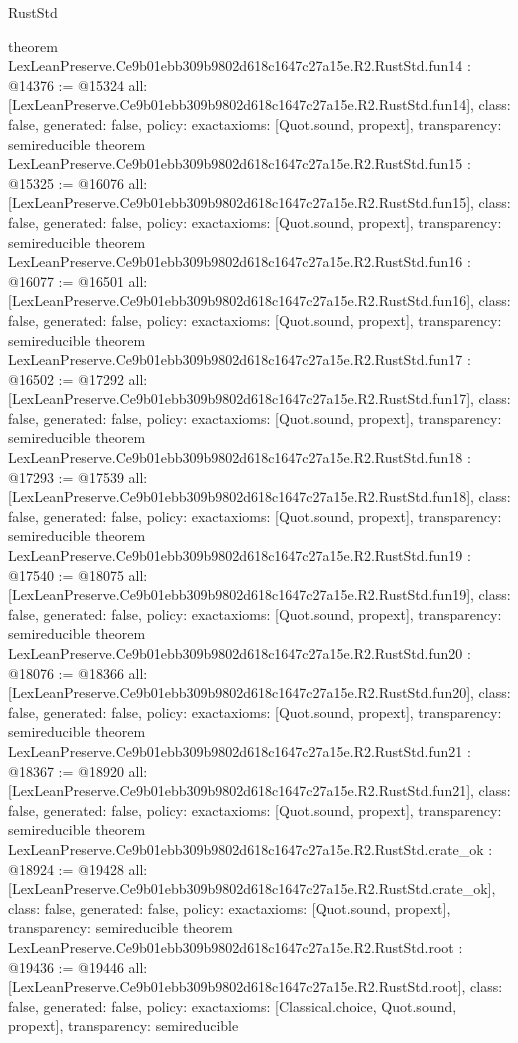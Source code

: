 \begin{lexlean}{RustStd}
\begin{coremodule}
{}
theorem LexLeanPreserve.Ce9b01ebb309b9802d618c1647c27a15e.R2.RustStd.fun14 : @14376 := @15324 {
  all: [LexLeanPreserve.Ce9b01ebb309b9802d618c1647c27a15e.R2.RustStd.fun14],
  class: false,
  generated: false,
  policy: exact{axioms: [Quot.sound, propext]},
  transparency: semireducible
}
theorem LexLeanPreserve.Ce9b01ebb309b9802d618c1647c27a15e.R2.RustStd.fun15 : @15325 := @16076 {
  all: [LexLeanPreserve.Ce9b01ebb309b9802d618c1647c27a15e.R2.RustStd.fun15],
  class: false,
  generated: false,
  policy: exact{axioms: [Quot.sound, propext]},
  transparency: semireducible
}
theorem LexLeanPreserve.Ce9b01ebb309b9802d618c1647c27a15e.R2.RustStd.fun16 : @16077 := @16501 {
  all: [LexLeanPreserve.Ce9b01ebb309b9802d618c1647c27a15e.R2.RustStd.fun16],
  class: false,
  generated: false,
  policy: exact{axioms: [Quot.sound, propext]},
  transparency: semireducible
}
theorem LexLeanPreserve.Ce9b01ebb309b9802d618c1647c27a15e.R2.RustStd.fun17 : @16502 := @17292 {
  all: [LexLeanPreserve.Ce9b01ebb309b9802d618c1647c27a15e.R2.RustStd.fun17],
  class: false,
  generated: false,
  policy: exact{axioms: [Quot.sound, propext]},
  transparency: semireducible
}
theorem LexLeanPreserve.Ce9b01ebb309b9802d618c1647c27a15e.R2.RustStd.fun18 : @17293 := @17539 {
  all: [LexLeanPreserve.Ce9b01ebb309b9802d618c1647c27a15e.R2.RustStd.fun18],
  class: false,
  generated: false,
  policy: exact{axioms: [Quot.sound, propext]},
  transparency: semireducible
}
theorem LexLeanPreserve.Ce9b01ebb309b9802d618c1647c27a15e.R2.RustStd.fun19 : @17540 := @18075 {
  all: [LexLeanPreserve.Ce9b01ebb309b9802d618c1647c27a15e.R2.RustStd.fun19],
  class: false,
  generated: false,
  policy: exact{axioms: [Quot.sound, propext]},
  transparency: semireducible
}
theorem LexLeanPreserve.Ce9b01ebb309b9802d618c1647c27a15e.R2.RustStd.fun20 : @18076 := @18366 {
  all: [LexLeanPreserve.Ce9b01ebb309b9802d618c1647c27a15e.R2.RustStd.fun20],
  class: false,
  generated: false,
  policy: exact{axioms: [Quot.sound, propext]},
  transparency: semireducible
}
theorem LexLeanPreserve.Ce9b01ebb309b9802d618c1647c27a15e.R2.RustStd.fun21 : @18367 := @18920 {
  all: [LexLeanPreserve.Ce9b01ebb309b9802d618c1647c27a15e.R2.RustStd.fun21],
  class: false,
  generated: false,
  policy: exact{axioms: [Quot.sound, propext]},
  transparency: semireducible
}
theorem LexLeanPreserve.Ce9b01ebb309b9802d618c1647c27a15e.R2.RustStd.crate_ok : @18924 := @19428 {
  all: [LexLeanPreserve.Ce9b01ebb309b9802d618c1647c27a15e.R2.RustStd.crate_ok],
  class: false,
  generated: false,
  policy: exact{axioms: [Quot.sound, propext]},
  transparency: semireducible
}
theorem LexLeanPreserve.Ce9b01ebb309b9802d618c1647c27a15e.R2.RustStd.root : @19436 := @19446 {
  all: [LexLeanPreserve.Ce9b01ebb309b9802d618c1647c27a15e.R2.RustStd.root],
  class: false,
  generated: false,
  policy: exact{axioms: [Classical.choice, Quot.sound, propext]},
  transparency: semireducible
}


\end{coremodule}
\end{lexlean}
